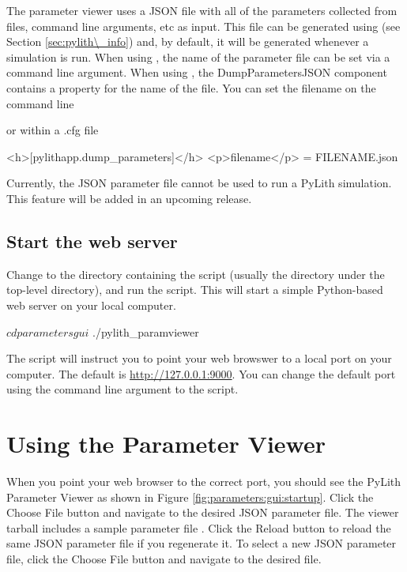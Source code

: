 The parameter viewer uses a JSON file with all of the parameters
collected from  files, command line arguments, etc as
input. This file can be generated using  (see
Section \ref{sec:pylith\_info}) and, by default, it will be generated
whenever a  simulation is run. When using
, the name of the parameter file can be set via a
command line argument. When using , the
DumpParametersJSON component contains a property for the name of the
file. You can set the filename on the command line
or within a .cfg file
\begin{cfg}
<h>[pylithapp.dump_parameters]</h>
<p>filename</p> = FILENAME.json
\end{cfg}
Currently, the JSON parameter file cannot be used to run a PyLith
simulation. This feature will be added in an upcoming release.


\subsection{Start the web server}

Change to the directory containing the 
script (usually the  directory under the top-level
 directory), and run the 
script. This will start a simple Python-based web server on your local
computer.
\begin{shell}
$ cd parametersgui
$ ./pylith_paramviewer
\end{shell}
The script will instruct you to point your web browswer to a local
port on your computer. The default is \url{http://127.0.0.1:9000}.
You can change the default port using the  command
line argument to the  script.


\section{Using the Parameter Viewer}

When you point your web browser to the correct port, you should see
the PyLith Parameter Viewer as shown in Figure
\ref{fig:parameters:gui:startup}.  Click the \textsf{Choose File}
button and navigate to the desired JSON parameter file. The viewer
tarball includes a sample parameter file
. Click the \textsf{Reload} button
to reload the same JSON parameter file if you regenerate it. To select
a new JSON parameter file, click the \textsf{Choose File} button and
navigate to the desired file.

